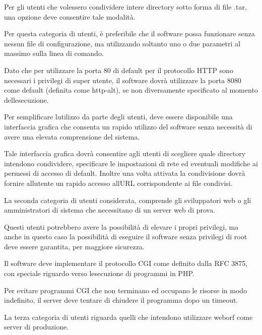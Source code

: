 \documentclass[a4paper,11pt]{article}
\begin{document}
{\sffamily
Per gli utenti che volessero condividere intere directory sotto forma di
file .tar, una opzione deve consentire tale modalit\`a.}

{\sffamily
Per questa categoria di utenti, \`e preferibile che il software possa
funzionare senza nessun file di configurazione, ma utilizzando soltanto
uno o due parametri al massimo sulla linea di comando.}

{\sffamily
Dato che per utilizzare la porta 80 di default per il protocollo HTTP
sono necessari i privilegi di super utente, il software dovr\`a
utilizzare la porta 8080 come default (definita come http-alt)\cite{STD04},
se non diversamente specificato al momento
dell{\textquotesingle}esecuzione.}

{\sffamily
Per semplificare l{\textquotesingle}utilizzo da parte degli utenti, deve
essere disponibile una interfaccia grafica che consenta un rapido
utilizzo del software senza necessit\`a di avere una elevata
comprensione del sistema.}

{\sffamily
Tale interfaccia grafica dovr\`a consentire agli utenti di scegliere
quale directory intendono condividere, specificare le impostazioni di
rete ed eventuali modifiche ai permessi di accesso di default. Inoltre
una volta attivata la condivisione dovr\`a fornire
all{\textquotesingle}utente un rapido accesso all{\textquotesingle}URL
corrispondente ai file condivisi.}


\bigskip

{\sffamily
La seconda categoria di utenti considerata, comprende gli sviluppatori
web o gli amministratori di sistema che necessitano di un server web di
prova.}

{\sffamily
Questi utenti potrebbero avere la possibilit\`a di elevare i propri
privilegi, ma anche in questo caso la possibilit\`a di eseguire il
software senza privilegi di root deve essere garantita, per maggiore
sicurezza.}

{\sffamily
Il software deve implementare il protocollo CGI come definito dalla RFC
3875, con speciale riguardo verso l{\textquotesingle}esecuzione di
programmi in PHP.}

{\sffamily
Per evitare programmi CGI che non terminano ed occupano le risorse in
modo indefinito, il server deve tentare di chiudere il programma dopo
un timeout.}


\bigskip

{\sffamily
La terza categoria di utenti riguarda quelli che intendono utilizzare
weborf come server di produzione.}
\end{document}
